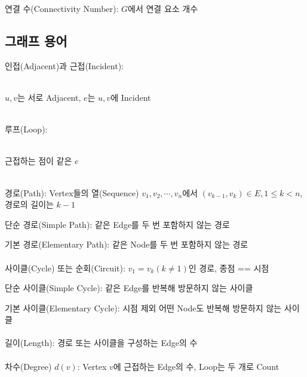 연결 수(Connectivity Number): $G$에서 연결 요소 개수
\newpage
\subsection{그래프 용어}
인접(Adjacent)과 근접(Incident):\\
\begin{center}
    \\
    $u, v$는 서로 Adjacent, $e$는 $u, v$에 Incident
\end{center}\phantom{}
\\
루프(Loop):\\
\begin{center}
    \\
    근접하는 점이 같은 $e$
\end{center}\phantom{}
\\
경로(Path): Vertex들의 열(Sequence) $v_1, v_2, \cdots, v_n$에서 $(v_{k-1}, v_k) \in E, 1 \leq k < n$, 경로의 길이는 $k - 1$

단순 경로(Simple Path): 같은 Edge를 두 번 포함하지 않는 경로

기본 경로(Elementary Path): 같은 Node를 두 번 포함하지 않는 경로
\\\\
사이클(Cycle) 또는 순회(Circuit): $v_1=v_k(k \neq 1)$인 경로, 종점 == 시점

단순 사이클(Simple Cycle): 같은 Edge를 반복해 방문하지 않는 사이클

기본 사이클(Elementary Cycle): 시점 제외 어떤 Node도 반복해 방문하지 않는 사이클
\\\\ 
길이(Length): 경로 또는 사이클을 구성하는 Edge의 수
\\\\
차수(Degree) $d(v)$: Vertex $v$에 근접하는 Edge의 수, Loop는 두 개로 Count

